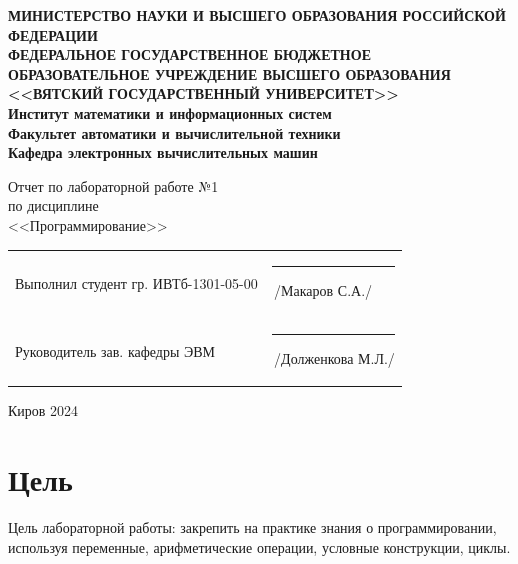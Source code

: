 \documentclass[a4paper,14pt]{extarticle}
\begin{document}
	
	\newpage\thispagestyle{empty}
	\begin{center}
		\textbf{
			\MakeUppercase{
				Министерство науки и высшего образования Российской Федерации\\
				Федеральное государственное бюджетное образовательное учреждение высшего образования\\
				<<Вятский Государственный Университет>>\\
			}
			Институт математики и информационных систем\\
			Факультет автоматики и вычислительной техники\\
			Кафедра электронных вычислительных машин
		}
	\end{center}
	\vfill
	
	\begin{center}
		Отчет по лабораторной работе №1\\
		по дисциплине\\
		<<Программирование>>\\
	\end{center}
	\vfill
	
	\noindent
	\begin{tabular}{ll}
		Выполнил студент гр. ИВТб-1301-05-00 \hspace{8mm} &
		\rule[-1mm]{20mm}{0.10mm}\,/Макаров С.А./\\
		
		Руководитель зав. кафедры ЭВМ & \rule[-1mm]{20mm}{0.10mm}\,/Долженкова М.Л./\\
	\end{tabular}
	
	\vfill
	\begin{center}
		Киров 2024
	\end{center}
	
	\newpage
	\section*{Цель}
	Цель лабораторной работы: закрепить на практике знания о программировании, используя переменные, арифметические операции, условные конструкции, циклы.
	
\end{document}
